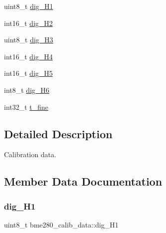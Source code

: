 \begin{DoxyCompactItemize}
\item 
uint8\+\_\+t \hyperlink{structbme280__calib__data_aa6521d4105f928a3734361923ded1402}{dig\+\_\+\+H1}
\item 
int16\+\_\+t \hyperlink{structbme280__calib__data_a129f0a99b6fa997aff11d1e66800f762}{dig\+\_\+\+H2}
\item 
uint8\+\_\+t \hyperlink{structbme280__calib__data_a567370a48166d5c44493f0bf172fbaad}{dig\+\_\+\+H3}
\item 
int16\+\_\+t \hyperlink{structbme280__calib__data_a2b1fb6cbf75cae79fa5ea43d8e5eb6f7}{dig\+\_\+\+H4}
\item 
int16\+\_\+t \hyperlink{structbme280__calib__data_a36cff966ad8a2777b773b5da5930830b}{dig\+\_\+\+H5}
\item 
int8\+\_\+t \hyperlink{structbme280__calib__data_a9aab678b157796957cb0819fa3027599}{dig\+\_\+\+H6}
\item 
int32\+\_\+t \hyperlink{structbme280__calib__data_a035b8d8756456820ec82f26a2cf62ffa}{t\+\_\+fine}
\end{DoxyCompactItemize}



\subsection{Detailed Description}
Calibration data. 

\subsection{Member Data Documentation}
\mbox{\label{structbme280__calib__data_aa6521d4105f928a3734361923ded1402}} 
\subsubsection{\texorpdfstring{dig\+\_\+\+H1}{dig\_H1}}
{\footnotesize\ttfamily uint8\+\_\+t bme280\+\_\+calib\+\_\+data\+::dig\+\_\+\+H1}

\mbox{\label{structbme280__calib__data_a129f0a99b6fa997aff11d1e66800f762}} 
